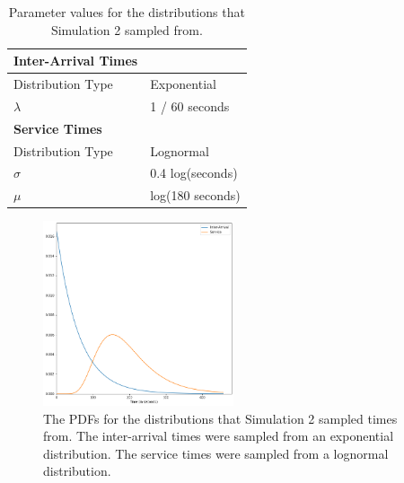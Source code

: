 \begin{table}
  \begin{tabular}{|l|l|}
    \hline
    \textbf{Inter-Arrival Times} & \\
    \hline
    Distribution Type & Exponential\\
    \hline
    $\lambda$ & 1 / 60 seconds\\
    \hline
    \hline
    \textbf{Service Times} & \\
    \hline
    Distribution Type & Lognormal\\
    \hline
    $\sigma$ & 0.4 log(seconds)\\
    \hline
    $\mu$ & log(180 seconds)\\
    \hline
  \end{tabular}
  \caption{Parameter values for the distributions that Simulation 2 sampled
    from.}\label{tab:sim2_params}
\end{table}

\begin{figure}[h]
  \includegraphics[width=0.5\textwidth]{figures/montecarlo/expon_lognorm.png}
  \caption{
    The PDFs for the distributions that Simulation 2
    sampled times from.
    The inter-arrival times were sampled from an exponential distribution.
    The service times were sampled from a lognormal distribution.
  }\label{fig:simple_sim2_dists}
\end{figure}


